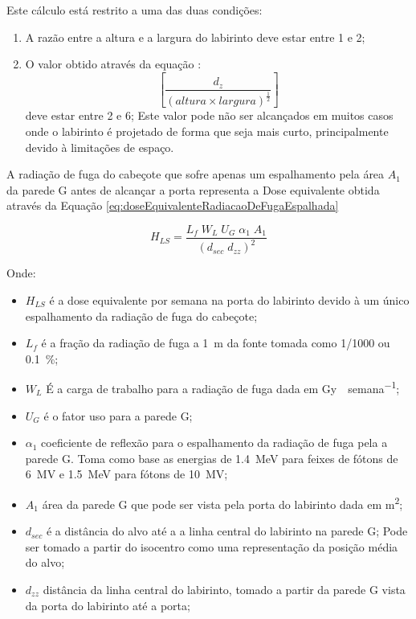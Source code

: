 \documentclass[11pt,a4paper]{article}
\begin{document}
            Este cálculo está restrito a uma das duas condições:

                \begin{enumerate}
                    \item A razão entre a altura e a largura do labirinto deve estar entre 1 e 2;
                    \item O valor obtido através da equação : $$\left[\frac{d_z}{\left(altura \times largura\right)^\frac{1}{2}}\right]$$ deve estar entre 2 e 6; Este valor pode não ser alcançados em muitos casos onde o labirinto é projetado de forma que seja mais curto, principalmente devido à limitações de espaço.
                \end{enumerate}
            
            
            A radiação de fuga do cabeçote que sofre apenas um espalhamento pela área $A_1$ da parede G antes de alcançar a porta representa a Dose equivalente obtida através da Equação \ref{eq:doseEquivalenteRadiacaoDeFugaEspalhada}

                \begin{equation}
                    H_{LS} = \frac{L_f \; W_L \; U_G \; \alpha_1 \; A_1}{\left(d_{sec} \; d_{zz}\right)^2}
                    \label{eq:doseEquivalenteRadiacaoDeFugaEspalhada}
                \end{equation}

            Onde:

                \begin{itemize}
                    \item $H_{LS}$ é a dose equivalente por semana na porta do labirinto devido à um único espalhamento da radiação de fuga do cabeçote;
                    \item $L_f$ é a fração da radiação de fuga a \qty{1}{m} da fonte tomada como 1/1000 ou \qty{0.1}{\%};
                    \item $W_L$ É a carga de trabalho para a radiação de fuga dada em \unit{Gy \; semana^{-1}};
                    \item $U_G$ é o fator uso para a parede G;
                    \item $\alpha_1$ coeficiente de reflexão para o espalhamento da radiação de fuga pela a parede G. Toma como base as energias de \qty{1.4}{MeV} para feixes de fótons de \qty{6}{MV} e \qty{1.5}{MeV} para fótons de \qty{10}{MV};
                    \item $A_1$ área da parede G que pode ser vista pela porta do labirinto dada em \unit{m^2};
                    \item $d_{sec}$ é a distância do alvo até a a linha central do labirinto na parede G; Pode ser tomado a partir do isocentro como uma representação da posição média do alvo;
                    \item $d_{zz}$ distância da linha central do labirinto, tomado a partir da parede G vista da porta do labirinto até a porta;
                \end{itemize}
            
\end{document}
